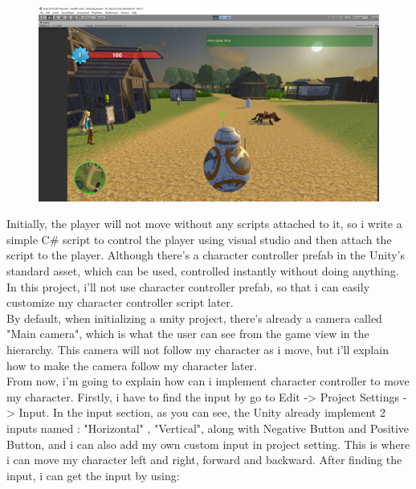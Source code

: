 \documentclass[a4paper, 13pt]{extarticle}
\begin{document}
 	 \begin{figure}[h]
 	 	\centering
 	 	\begin{minipage}{1\textwidth}
 	 		\centering
 	 		\includegraphics[width=0.75\linewidth]{intructions/4.png}
 	 		\label{fig:test5}
 	 	\end{minipage}
 	 \end{figure}
 	  
 	 Initially, the player will not move without any scripts attached to it, so i write a simple C\# script to control the player using visual studio and then attach the script to the player. Although there's a character controller prefab in the Unity's standard asset, which can be used, controlled instantly without doing anything. In this project, i'll not use character controller prefab, so that i can easily customize my character controller script later. \\[0.25cm] By default, when initializing a unity project, there's already a camera called "Main camera", which is what the user can see from the game view in the hierarchy. This camera will not follow my character as i move, but i'll explain how to make the camera follow my character later.  
 	 \\[0.25cm] From now, i'm going to explain how can i implement character controller to move my character. Firstly, i have to find the input by go to Edit -> Project Settings -> Input. In the input section, as you can see, the Unity already implement 2 inputs named : "Horizontal" , "Vertical", along with Negative Button and Positive Button, and i can also add my own custom input in project setting. This is where i can move my character left and right, forward and backward. After finding the input, i can get the input by using: 
  
\end{document}
